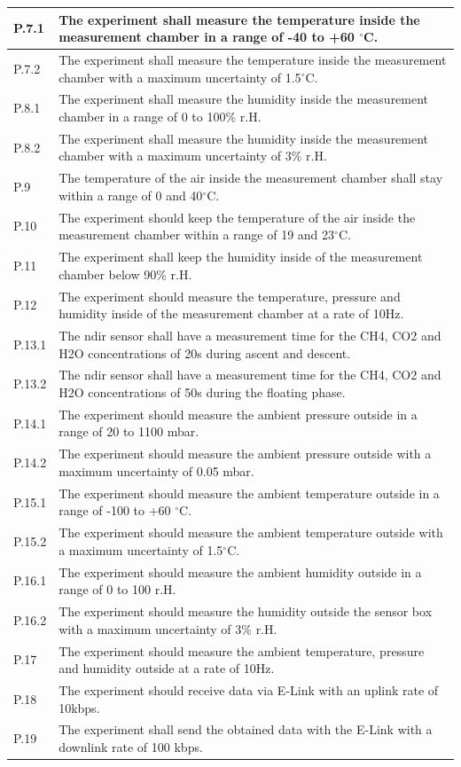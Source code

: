 \documentclass[12pt,a4paper]{report}
\newcommand{\degree}{\ensuremath{^\circ}}
\begin{document}
\begin{longtable}{|p{2cm}|p{12cm}|}
\hline
P.7.1 & The experiment shall measure the temperature inside the measurement chamber in a range of -40 to +60 \degree C. \\
\hline
P.7.2 & The experiment shall measure the temperature inside the measurement chamber with a maximum uncertainty of 1.5\degree C. \\
\hline
P.8.1 & The experiment shall measure the humidity inside the measurement chamber in a range of 0 to 100\% r.H. \\
\hline
P.8.2 & The experiment shall measure the humidity inside the measurement chamber with a maximum uncertainty of 3\% r.H. \\
\hline
P.9 & The temperature of the air inside the measurement chamber shall stay within a range of 0 and 40\degree C. \\
\hline
P.10 & The experiment should keep the temperature of the air inside the measurement chamber within a range of 19 and 23\degree C. \\
\hline
P.11 & The experiment shall keep the humidity inside of the measurement chamber below 90\% r.H. \\
\hline
P.12 & The experiment should measure the temperature, pressure and humidity inside of the measurement chamber at a rate of 10Hz. \\
\hline
P.13.1 & The \ac{ndir} sensor shall have a measurement time for the CH4, CO2 and H2O concentrations of 20s during ascent and descent. \\
\hline
P.13.2 & The \ac{ndir} sensor shall have a measurement time for the CH4, CO2 and H2O concentrations of 50s during the floating phase. \\
\hline
P.14.1 & The experiment should measure the ambient pressure outside in a range of 20 to 1100 mbar. \\
\hline
P.14.2 & The experiment should measure the ambient pressure outside with a maximum uncertainty of 0.05 mbar. \\
\hline
P.15.1 & The experiment should measure the ambient temperature outside in a range of -100 to +60 \degree C. \\
\hline
P.15.2 & The experiment should measure the ambient temperature outside with a maximum uncertainty of 1.5\degree C. \\
\hline
P.16.1 & The experiment should measure the ambient humidity outside in a range of 0 to 100 r.H. \\
\hline
P.16.2 & The experiment should measure the humidity outside the sensor box with a maximum uncertainty of 3\% r.H. \\
\hline
P.17 & The experiment should measure the ambient temperature, pressure and humidity outside at a rate of 10Hz. \\
\hline
P.18 & The experiment should receive data via E-Link with an uplink rate of 10kbps. \\
\hline
P.19 & The experiment shall send the obtained data with the E-Link with a downlink rate of 100 kbps. \\
\hline
\end{longtable}
\end{document}
